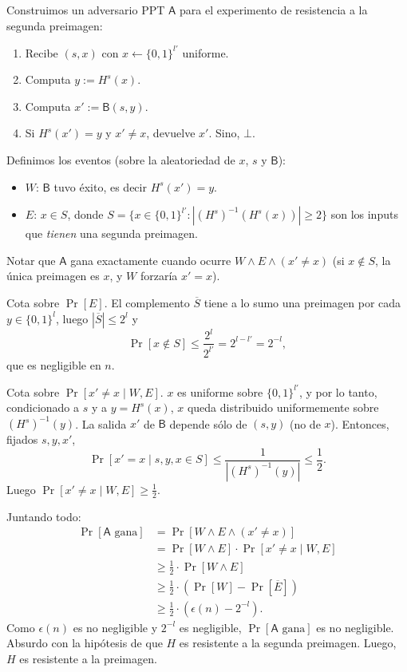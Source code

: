 \documentclass[12pt,addpoints,answers]{exam}
\begin{document}
\begin{questions}
\begin{parts}
\begin{solution}
  Construimos un adversario PPT $\mathsf{A}$ para el experimento de resistencia a la segunda preimagen:
  \begin{enumerate}
    \item Recibe $(s, x)$ con $x \leftarrow \{0,1\}^{l'}$ uniforme.
    \item Computa $y := H^s(x)$.
    \item Computa $x' := \mathsf{B}(s, y)$.
    \item Si $H^s(x') = y$ y $x' \neq x$, devuelve $x'$. Sino, $\bot$.
  \end{enumerate}

  Definimos los eventos (sobre la aleatoriedad de $x$, $s$ y $\mathsf{B}$):
  \begin{itemize}
    \item $W$: $\mathsf{B}$ tuvo éxito, es decir $H^s(x') = y$.
    \item $E$: $x \in S$, donde $S = \{x \in \{0,1\}^{l'} : |(H^s)^{-1}(H^s(x))| \geq 2\}$ son los inputs que \emph{tienen} una segunda preimagen.
  \end{itemize}
  Notar que $\mathsf{A}$ gana exactamente cuando ocurre $W \wedge E \wedge (x' \neq x)$ (si $x \notin S$, la única preimagen es $x$, y $W$ forzaría $x' = x$).

  Cota sobre $\Pr[E]$. El complemento $\overline{S}$ tiene a lo sumo una preimagen por cada $y \in \{0,1\}^l$, luego $|\overline{S}| \leq 2^l$ y
  $$\Pr[x \notin S] \leq \frac{2^l}{2^{l'}} = 2^{l-l'} = 2^{-l},$$
  que es negligible en $n$.

  Cota sobre $\Pr[x' \neq x \mid W, E]$. $x$ es uniforme sobre $\{0,1\}^{l'}$, y por lo tanto, condicionado a $s$ y a $y = H^s(x)$, $x$ queda distribuido uniformemente sobre $(H^s)^{-1}(y)$. La salida $x'$ de $\mathsf{B}$ depende sólo de $(s, y)$ (no de $x$). Entonces, fijados $s, y, x'$,
  $$\Pr[x' = x \mid s, y, x \in S] \leq \frac{1}{|(H^s)^{-1}(y)|} \leq \frac{1}{2}.$$
  Luego $\Pr[x' \neq x \mid W, E] \geq \frac{1}{2}$.

  Juntando todo:
  \begin{align*}
    \Pr[\mathsf{A} \text{ gana}] &= \Pr[W \wedge E \wedge (x' \neq x)] \\
    &= \Pr[W \wedge E] \cdot \Pr[x' \neq x \mid W, E] \\
    &\geq \tfrac{1}{2} \cdot \Pr[W \wedge E] \\
    &\geq \tfrac{1}{2} \cdot (\Pr[W] - \Pr[\overline{E}]) \\
    &\geq \tfrac{1}{2} \cdot (\epsilon(n) - 2^{-l}).
  \end{align*}
  Como $\epsilon(n)$ es no negligible y $2^{-l}$ es negligible, $\Pr[\mathsf{A} \text{ gana}]$ es no negligible. Absurdo con la hipótesis de que $H$ es resistente a la segunda preimagen. Luego, $H$ es resistente a la preimagen.


\end{solution}
\end{parts}
\end{questions}
\end{document}
